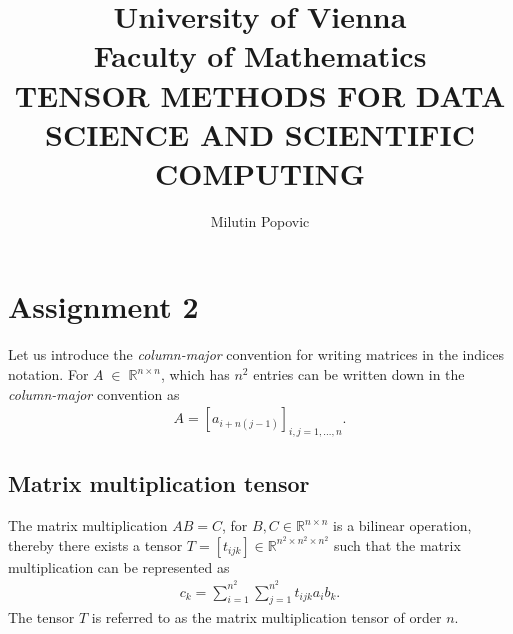 \documentclass[a4paper]{article}
\title{University of Vienna\\ Faculty of Mathematics\\
\vspace{1cm}TENSOR METHODS FOR DATA SCIENCE AND SCIENTIFIC COMPUTING
}
\author{Milutin Popovic}
\begin{document}
\maketitle
\tableofcontents
\section{Assignment 2}

Let us introduce the \textit{column-major} convention for writing matrices in
the indices notation. For $A \; \in \; \mathbb{R}^{n\times n}$, which has
$n^2$ entries can be written down in the \textit{column-major} convention as
\begin{align}
    A = [a_{i+n(j-1)}]_{i,j = 1,\dots,n}.
\end{align}
\subsection{Matrix multiplication tensor}
The matrix multiplication $AB=C$, for $B, C \in \mathbb{R}^{n\times n}$ is a
bilinear operation, thereby there exists a tensor $ T = [t_{ijk}]\in
\mathbb{R}^{n^2\times n^2\times n^2}$ such that the matrix multiplication can be
represented as
\begin{align}
    c_k = \sum_{i=1}^{n^2}\sum_{j=1}^{n^2}t_{ijk}a_i b_k.
\end{align}
The tensor $T$ is referred to as the matrix multiplication tensor of order $n$.
\end{document}
